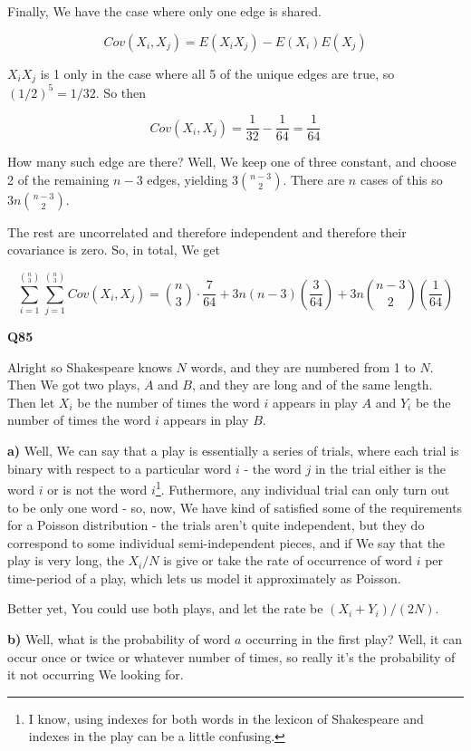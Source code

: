 \documentclass{article}
\begin{document}
			Finally, We have the case where only one edge is shared. 
			
			\[ Cov(X_i, X_j) = E(X_iX_j) - E(X_i)E(X_j) \]
			
			$X_iX_j$ is 1 only in the case where all 5 of the unique edges are true, so $(1/2)^5 = 1/32$. So then
			
			\[ Cov(X_i, X_j) = \frac{1}{32} - \frac{1}{64} = \frac{1}{64} \] 
			
			How many such edge are there? Well, We keep one of three constant, and choose 2 of the remaining $n-3$ edges, yielding $3{n-3\choose 2}$. There are $n$ cases of this so $3n{n-3\choose 2}$.
			
			The rest are uncorrelated and therefore independent and therefore their covariance is zero. So, in total, We get
			
			\[  \sum^{{n\choose 3}}_{i=1} \sum^{{n\choose 3}}_{j=1} Cov(X_i, X_j) = {n\choose 3}\cdot \frac{7}{64} + 3n(n-3)\left(\frac{3}{64}\right) + 3n{n-3\choose 2}\left(\frac{1}{64}\right)\]
			
			\hfill
			
		\textbf{Q85}
		
			Alright so Shakespeare knows $N$ words, and they are numbered from 1 to $N$. Then We got two plays, $A$ and $B$, and they are long and of the same length. Then let $X_i$ be the number of times the word $i$ appears in play $A$ and $Y_i$ be the number of times the word $i$ appears in play $B$.
			
			\textbf{a)} Well, We can say that a play is essentially a series of trials, where each trial is binary with respect to a particular word $i$ - the word $j$ in the trial either is the word $i$ or is not the word $i$\footnote{I know, using indexes for both words in the lexicon of Shakespeare and indexes in the play can be a little confusing.}. Futhermore, any individual trial can only turn out to be only one word - so, now, We have kind of satisfied some of the requirements for a Poisson distribution - the trials aren't quite independent, but they do correspond to some individual semi-independent pieces, and if We say that the play is very long, the $X_i/N$ is give or take the rate of occurrence of word $i$ per time-period of a play, which lets us model it approximately as Poisson.
			
			Better yet, You could use both plays, and let the rate be $(X_i+Y_i)/(2N)$.
			
			\textbf{b)} Well, what is the probability of word $a$ occurring in the first play? Well, it can occur once or twice or whatever number of times, so really it's the probability of it not occurring We looking for. 
			
\end{document}
